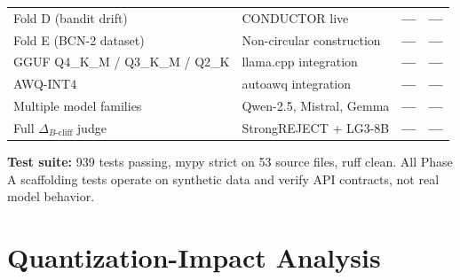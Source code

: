 \documentclass[11pt,a4paper]{article}
\newcommand{\bcliff}{\Delta_{B\text{-cliff}}}
\newcommand{\NO}{\textcolor{red!60!black}{\textbf{---}}}
\begin{document}
\begin{table}[H]
\begin{tabularx}{\textwidth}{@{}lXll@{}}
    Fold D (bandit drift) & CONDUCTOR live & \NO{} & \NO{} \\
    Fold E (BCN-2 dataset) & Non-circular construction & \NO{} & \NO{} \\
    \midrule
    GGUF Q4\_K\_M / Q3\_K\_M / Q2\_K & llama.cpp integration & \NO{} & \NO{} \\
    AWQ-INT4 & autoawq integration & \NO{} & \NO{} \\
    Multiple model families & Qwen-2.5, Mistral, Gemma & \NO{} & \NO{} \\
    Full $\bcliff$ judge & StrongREJECT + LG3-8B & \NO{} & \NO{} \\
    \bottomrule
  \end{tabularx}
\end{table}

\textbf{Test suite:} 939 tests passing, mypy strict on 53 source files, ruff clean.
All Phase A scaffolding tests operate on synthetic data and verify API contracts,
not real model behavior.

\section{Quantization-Impact Analysis}
\label{sec:quant_impact}
\end{document}
